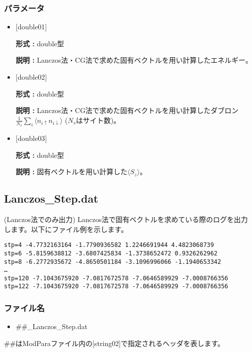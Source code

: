 \subsubsection{パラメータ}
 \begin{itemize}

  \item  $[$double01$]$
  
 {\bf 形式 :} double型

{\bf 説明 :} Lanczos法・CG法で求めた固有ベクトルを用い計算したエネルギー。
 
  \item  $[$double02$]$

 {\bf 形式 :} double型 

{\bf 説明 :} Lanczos法・CG法で求めた固有ベクトルを用い計算したダブロン
$\frac{1}{N_s} \sum_{i}\langle n_{i\uparrow}n_{i\downarrow}\rangle$ ($N_s$はサイト数)。

 \item  $[$double03$]$

 {\bf 形式 :} double型 

{\bf 説明 :} 固有ベクトルを用い計算した$\langle S_z\rangle$。

 \end{itemize}

\newpage
\subsection{Lanczos\_Step.dat}
(Lanczos法でのみ出力) Lanczos法で固有ベクトルを求めている際のログを出力します。以下にファイル例を示します。\\
\begin{minipage}{15cm}
\begin{screen}
\begin{verbatim}
stp=4 -4.7732163164 -1.7790936582 1.2246691944 4.4823068739
stp=6 -5.8159638812 -3.6807425834 -1.3738652472 0.9326262962
stp=8 -6.2772935672 -4.8650501184 -3.1096996066 -1.1940653342
…
stp=120 -7.1043675920 -7.0817672578 -7.0646589929 -7.0008766356
stp=122 -7.1043675920 -7.0817672578 -7.0646589929 -7.0008766356
\end{verbatim}
\end{screen}
\end{minipage}

\subsubsection{ファイル名}
 \begin{itemize}
   \item  \#\#\_Lanczos\_Step.dat
  \end{itemize}
  \#\#はModParaファイル内の[string02]で指定されるヘッダを表します。


